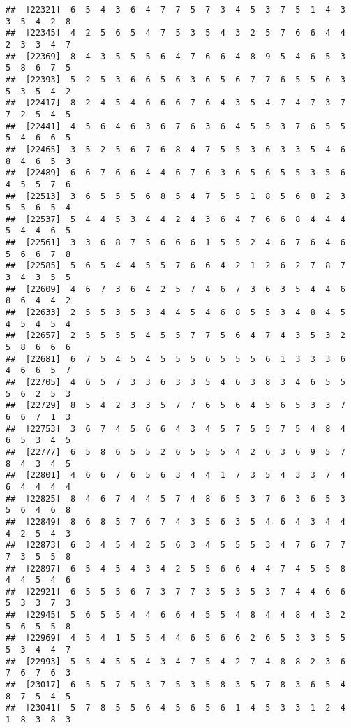\documentclass[
]{book}
\begin{document}
\begin{verbatim}
##  [22321]  6  5  4  3  6  4  7  7  5  7  3  4  5  3  7  5  1  4  3  3  5  4  2  8
##  [22345]  4  2  5  6  5  4  7  5  3  5  4  3  2  5  7  6  6  4  4  2  3  3  4  7
##  [22369]  8  4  3  5  5  5  6  4  7  6  6  4  8  9  5  4  6  5  3  5  8  6  7  5
##  [22393]  5  2  5  3  6  6  5  6  3  6  5  6  7  7  6  5  5  6  3  5  3  5  4  2
##  [22417]  8  2  4  5  4  6  6  6  7  6  4  3  5  4  7  4  7  3  7  7  2  5  4  5
##  [22441]  4  5  6  4  6  3  6  7  6  3  6  4  5  5  3  7  6  5  5  5  4  6  6  5
##  [22465]  3  5  2  5  6  7  6  8  4  7  5  5  3  6  3  3  5  4  6  8  4  6  5  3
##  [22489]  6  6  7  6  6  4  4  6  7  6  3  6  5  6  5  5  3  5  6  4  5  5  7  6
##  [22513]  3  6  5  5  5  6  8  5  4  7  5  5  1  8  5  6  8  2  3  5  5  6  5  4
##  [22537]  5  4  4  5  3  4  4  2  4  3  6  4  7  6  6  8  4  4  4  5  4  4  6  5
##  [22561]  3  3  6  8  7  5  6  6  6  1  5  5  2  4  6  7  6  4  6  5  6  6  7  8
##  [22585]  5  6  5  4  4  5  5  7  6  6  4  2  1  2  6  2  7  8  7  3  4  3  5  5
##  [22609]  4  6  7  3  6  4  2  5  7  4  6  7  3  6  3  5  4  4  6  8  6  4  4  2
##  [22633]  2  5  5  3  5  3  4  4  5  4  6  8  5  5  3  4  8  4  5  4  5  4  5  4
##  [22657]  2  5  5  5  5  4  5  5  7  7  5  6  4  7  4  3  5  3  2  5  8  6  6  6
##  [22681]  6  7  5  4  5  4  5  5  5  6  5  5  5  6  1  3  3  3  6  4  6  6  5  7
##  [22705]  4  6  5  7  3  3  6  3  3  5  4  6  3  8  3  4  6  5  5  5  6  2  5  3
##  [22729]  8  5  4  2  3  3  5  7  7  6  5  6  4  5  6  5  3  3  7  6  6  7  1  3
##  [22753]  3  6  7  4  5  6  6  4  3  4  5  7  5  5  7  5  4  8  4  6  5  3  4  5
##  [22777]  6  5  8  6  5  5  2  6  5  5  5  4  2  6  3  6  9  5  7  8  4  3  4  5
##  [22801]  4  6  6  7  6  5  6  3  4  4  1  7  3  5  4  3  3  7  4  6  4  4  4  4
##  [22825]  8  4  6  7  4  4  5  7  4  8  6  5  3  7  6  3  6  5  3  5  6  4  6  8
##  [22849]  8  6  8  5  7  6  7  4  3  5  6  3  5  4  6  4  3  4  4  4  2  5  4  3
##  [22873]  6  3  4  5  4  2  5  6  3  4  5  5  5  3  4  7  6  7  7  7  3  5  5  8
##  [22897]  6  5  4  5  4  3  4  2  5  5  6  6  4  4  7  4  5  5  8  4  4  5  4  6
##  [22921]  6  5  5  5  6  7  3  7  7  3  5  3  5  3  7  4  4  6  6  5  3  3  7  3
##  [22945]  5  6  5  5  4  4  6  6  4  5  5  4  8  4  4  8  4  3  2  5  6  5  5  8
##  [22969]  4  5  4  1  5  5  4  4  6  5  6  6  2  6  5  3  3  5  5  5  3  4  4  7
##  [22993]  5  5  4  5  5  4  3  4  7  5  4  2  7  4  8  8  2  3  6  7  6  7  6  3
##  [23017]  6  5  5  7  5  3  7  5  3  5  8  3  5  7  8  3  6  5  4  8  7  5  4  5
##  [23041]  5  7  8  5  5  6  4  5  6  5  6  1  4  5  3  3  1  2  4  1  8  3  8  3

\end{verbatim}
\end{document}
